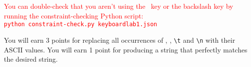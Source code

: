 \textcolor{red}{
You can double-check that you aren't using the \missingKey\ key or the backslash key by running the constraint-checking Python script: \\
\texttt{python constraint-check.py keyboardlab1.json}
}

You will earn 3 points for replacing all occurrences of \texttt{\missingKey}, \texttt{\lowercaseKey}, \texttt{\textbackslash t} and \texttt{\textbackslash n} with their ASCII values.
You will earn 1 point for producing a string that perfectly matches the desired string.

